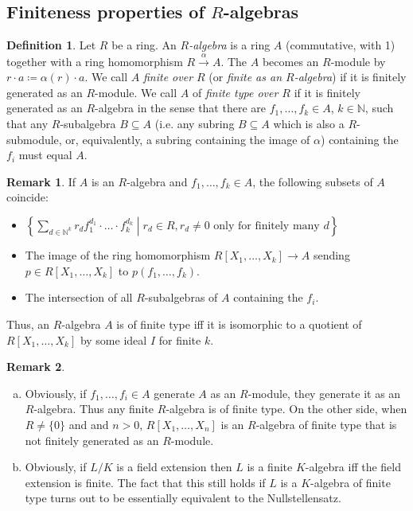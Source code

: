 \documentclass[DIV=14,parskip=half]{scrartcl}
\theoremstyle{definition}
\newtheorem{defi}{Definition}[subsection]
\newtheorem{rem}{Remark}[subsection]
\newcommand{\N}{\mathbb{N}}
\newcommand{\longto}{\longrightarrow}
\begin{document}
\subsection{Finiteness properties of $R$-algebras}
\begin{defi}
 Let $R$ be a ring. An \emph{$R$-algebra} is a ring $A$ (commutative, with 1) together with a ring homomorphism $R\overset{\alpha}{\longto} A$. The $A$ becomes an $R$-module by $r\cdot a \coloneqq \alpha(r) \cdot a$. We call $A$ \emph{finite over $R$} (or \emph{finite as an $R$-algebra}) if it is finitely generated as an $R$-module. We call $A$ of \emph{finite type over $R$} if it is finitely generated as an $R$-algebra in the sense that there are $f_1,\ldots, f_k\in A$, $k\in \N$, such that any $R$-subalgebra $B\subseteq A$ (i.e. any subring $B\subseteq A$ which is also a $R$-submodule, or, equivalently, a subring containing the image of $\alpha$) containing the $f_i$ must equal $A$.
\end{defi}
\begin{rem}
 If $A$ is an $R$-algebra and $f_1,\ldots,f_k\in A$, the following subsets of $A$ coincide:
 \begin{itemize}
  \item $\left\{\sum_{d\in \N^k} r_d f_1^{d_1}\cdot\ldots\cdot f_k^{d_k}\middle | r_d\in R, r_d\neq 0 \text{ only for finitely many } d\right\}$
  \item The image of the ring homomorphism $R[X_1,\ldots,X_k]\longto A$ sending $p\in R[X_1,\ldots, X_k]$ to $p(f_1,\ldots,f_k)$.
  \item The intersection of all $R$-subalgebras of $A$ containing the $f_i$.
 \end{itemize}
Thus, an $R$-algebra $A$ is of finite type iff it is isomorphic to a quotient of $R[X_1,\ldots, X_k]$ by some ideal $I$ for finite $k$.
\end{rem}
\begin{rem}
\begin{enumerate}[a)]
 \item Obviously, if $f_1,\ldots, f_i\in A$ generate $A$ as an $R$-module, they generate it as an $R$-algebra. Thus any finite $R$-algebra is of finite type. On the other side, when $R\neq \{0\}$ and and $n>0$, $R[X_1, \ldots, X_n]$ is an $R$-algebra of finite type that is not finitely generated as an $R$-module.
\item Obviously, if $L/K$ is a field extension then $L$ is a finite $K$-algebra iff the field extension is finite. The fact that this still holds if $L$ is a $K$-algebra of finite type turns out to be essentially equivalent to the Nullstellensatz.
 \end{enumerate}

\end{rem}
\end{document}
